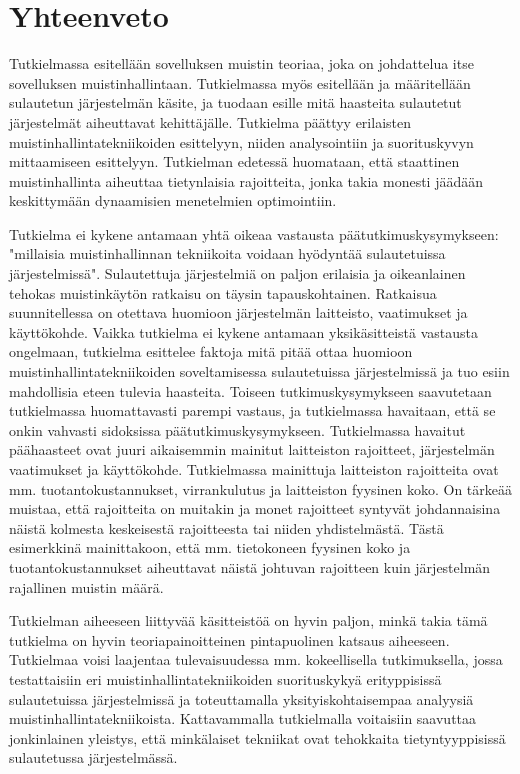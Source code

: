 \chapter{Yhteenveto} \label{Yhteenveto}

Tutkielmassa esitellään sovelluksen muistin teoriaa, joka on johdattelua itse sovelluksen muistinhallintaan. Tutkielmassa myös esitellään ja määritellään sulautetun järjestelmän käsite, ja tuodaan esille mitä haasteita sulautetut järjestelmät aiheuttavat kehittäjälle. Tutkielma päättyy erilaisten muistinhallintatekniikoiden esittelyyn, niiden analysointiin ja suorituskyvyn mittaamiseen esittelyyn. Tutkielman edetessä huomataan, että staattinen muistinhallinta aiheuttaa tietynlaisia rajoitteita, jonka takia monesti jäädään keskittymään dynaamisien menetelmien optimointiin.

Tutkielma ei kykene antamaan yhtä oikeaa vastausta päätutkimuskysymykseen: "millaisia muistinhallinnan tekniikoita voidaan hyödyntää sulautetuissa järjestelmissä". Sulautettuja järjestelmiä on paljon erilaisia ja oikeanlainen tehokas muistinkäytön ratkaisu on täysin tapauskohtainen. Ratkaisua suunnitellessa on otettava huomioon järjestelmän laitteisto, vaatimukset ja käyttökohde. Vaikka tutkielma ei kykene antamaan yksikäsitteistä vastausta ongelmaan, tutkielma esittelee faktoja mitä pitää ottaa huomioon muistinhallintatekniikoiden soveltamisessa sulautetuissa järjestelmissä ja tuo esiin mahdollisia eteen tulevia haasteita. Toiseen tutkimuskysymykseen saavutetaan tutkielmassa huomattavasti parempi vastaus, ja tutkielmassa havaitaan, että se onkin vahvasti sidoksissa päätutkimuskysymykseen. Tutkielmassa havaitut päähaasteet ovat juuri aikaisemmin mainitut laitteiston rajoitteet, järjestelmän vaatimukset ja käyttökohde. Tutkielmassa mainittuja laitteiston rajoitteita ovat mm. tuotantokustannukset, virrankulutus ja laitteiston fyysinen koko. On tärkeää muistaa, että rajoitteita on muitakin ja monet rajoitteet syntyvät johdannaisina näistä kolmesta keskeisestä rajoitteesta tai niiden yhdistelmästä. Tästä esimerkkinä mainittakoon, että mm. tietokoneen fyysinen koko ja tuotantokustannukset aiheuttavat näistä johtuvan rajoitteen kuin järjestelmän rajallinen muistin määrä.

Tutkielman aiheeseen liittyvää käsitteistöä on hyvin paljon, minkä takia tämä tutkielma on hyvin teoriapainoitteinen pintapuolinen katsaus aiheeseen. Tutkielmaa voisi laajentaa tulevaisuudessa mm. kokeellisella tutkimuksella, jossa testattaisiin eri muistinhallintatekniikoiden suorituskykyä erityppisissä sulautetuissa järjestelmissä ja toteuttamalla yksityiskohtaisempaa analyysiä muistinhallintatekniikoista. Kattavammalla tutkielmalla voitaisiin saavuttaa jonkinlainen yleistys, että minkälaiset tekniikat ovat tehokkaita tietyntyyppisissä sulautetussa järjestelmässä.